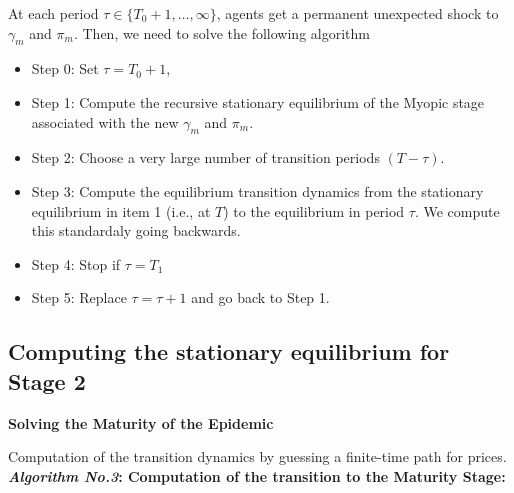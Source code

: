 At each period $\tau \in \{T_0+1,..., \infty\}$, agents get a permanent unexpected shock to $\gamma_m$ and $\pi_m$. Then, we need to solve the following algorithm %

\begin{itemize}
\item Step 0: Set $\tau=T_0+1$,
\item Step 1: Compute the recursive stationary equilibrium of the Myopic stage associated with the new $\gamma_m$ and $\pi_m$.
\item Step 2: Choose a very large number of transition  periods $(T-\tau)$.
\item Step 3: Compute the equilibrium transition dynamics from the stationary equilibrium in item 1 (i.e., at $T$) to the  equilibrium in period $\tau$. We compute this standardaly going backwards.
\item Step 4: Stop if $\tau=T_1$
\item Step 5: Replace $\tau=\tau+1$ and go back to Step 1.
\end{itemize}


\subsection*{Computing the stationary equilibrium for Stage 2}
\noindent \textbf{Solving the Maturity of the Epidemic}

Computation of the transition dynamics by guessing a finite-time path for prices.\\

\noindent \textbf{\textit{Algorithm No.3}: Computation of the transition to the Maturity Stage:}\\

